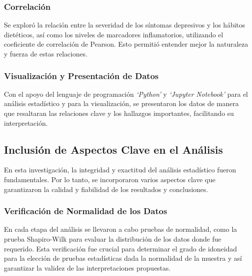 \documentclass[stu, 12pt]{apa7}
\begin{document}
	\subsubsection{Correlación } Se exploró la relación
	entre la severidad de los síntomas depresivos y los hábitos dietéticos,
	así como los niveles de marcadores inflamatorios, utilizando el
	coeficiente de correlación de Pearson. Esto permitió
	entender mejor la naturaleza y fuerza de estas relaciones.

	\subsubsection{Visualización y Presentación de Datos}
	Con el apoyo del lenguaje de programación \emph{`Python'} y \emph{`Jupyter Notebook'} para el análisis estadístico y para la visualización, se presentaron los datos de manera que resaltaran las relaciones clave y los hallazgos importantes, facilitando su interpretación.


	\subsection{Inclusión de Aspectos Clave en el Análisis}\label{inclusiuxf3n-de-aspectos-clave-en-el-anuxe1lisis}

	En esta investigación, la integridad y exactitud del análisis
	estadístico fueron fundamentales. Por lo tanto, se incorporaron varios
	aspectos clave que garantizaron la calidad y fiabilidad de los
	resultados y conclusiones.\\

	\subsubsection{Verificación de Normalidad de los Datos}
	En cada etapa del análisis se llevaron a cabo pruebas de normalidad, como la prueba
	Shapiro-Wilk para evaluar la distribución de los datos donde fue
	requerido. Esta verificación fue crucial para determinar el grado de
	idoneidad para la elección de pruebas estadísticas dada la normalidad de la
	muestra y así garantizar la validez de las interpretaciones propuestas.
\end{document}
